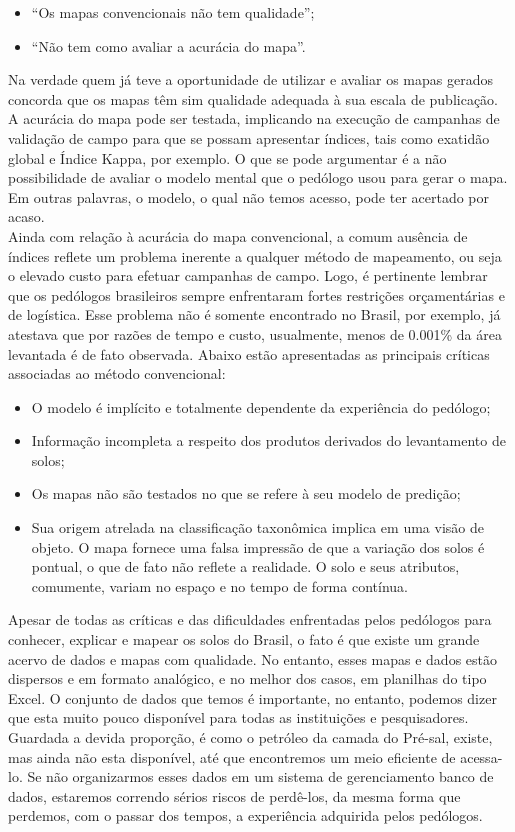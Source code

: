 \begin{itemize}
\item ``Os mapas convencionais não tem qualidade'';
\item ``Não tem como avaliar a acurácia do mapa''.
\end{itemize}
Na verdade quem já teve a oportunidade de utilizar e avaliar os mapas gerados concorda que os mapas têm sim qualidade adequada à sua escala de publicação. A acurácia do mapa pode ser testada, implicando na execução de campanhas de validação de campo para que se possam apresentar índices, tais como exatidão global e Índice Kappa, por exemplo. O que se pode argumentar é a não possibilidade de avaliar o modelo mental que o pedólogo usou para gerar o mapa. Em outras
palavras, o modelo, o qual não temos acesso, pode ter acertado por acaso.\\
Ainda com relação à acurácia do mapa convencional, a comum ausência de índices reflete um problema inerente a qualquer método de mapeamento, ou seja o elevado custo para efetuar campanhas de campo. Logo, é pertinente lembrar que os pedólogos brasileiros sempre enfrentaram fortes restrições orçamentárias e de logística. Esse
problema não é somente encontrado no Brasil, por exemplo, \cite{BurroughEtAl:1971} já atestava que por razões de tempo e custo, usualmente, menos de 0.001\% da área levantada é de fato observada. Abaixo estão apresentadas as principais críticas associadas ao método convencional:
\begin{itemize}
\item O modelo é implícito e totalmente dependente da experiência do pedólogo;
\item Informação incompleta a respeito dos produtos derivados do levantamento de solos;
\item Os mapas não são testados no que se refere à seu modelo de predição;
\item Sua origem atrelada na classificação taxonômica implica em uma visão de objeto. O mapa fornece uma falsa impressão de que a variação dos solos é pontual, o que de fato não reflete a realidade. O solo e seus atributos, comumente, variam no espaço e no tempo de forma contínua.
\end{itemize}
Apesar de todas as críticas e das dificuldades enfrentadas pelos pedólogos para conhecer, explicar e mapear os solos do Brasil, o fato é que existe um grande acervo de dados e mapas com qualidade. No entanto, esses mapas e dados estão dispersos e em formato analógico, e no melhor dos casos, em planilhas do tipo Excel. O conjunto de dados que temos é importante, no entanto, podemos dizer que esta muito pouco disponível para todas as instituições e pesquisadores. Guardada a devida
proporção, é como o petróleo da camada do Pré-sal, existe, mas ainda não esta disponível, até que encontremos um meio eficiente de acessa-lo. Se não organizarmos esses dados em um sistema de gerenciamento banco de dados, estaremos correndo sérios riscos de perdê-los, da mesma forma que perdemos, com o passar dos tempos, a experiência adquirida pelos pedólogos.
